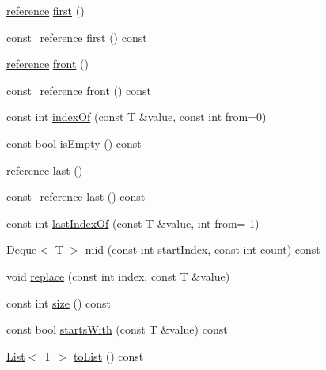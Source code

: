 \begin{DoxyCompactItemize}
\hyperlink{classprism_1_1_deque_a93d8792e719ca205ce1b9ed5d8207c1d}{reference} \hyperlink{classprism_1_1_deque_a9b4c76aae18b2d465f6e066fa3262cc4}{first} ()
\item 
\hyperlink{classprism_1_1_deque_a8fcabfe6976606b91b4abef0e0353584}{const\+\_\+reference} \hyperlink{classprism_1_1_deque_a3c85aba9fc52d657e965a7a395c16658}{first} () const 
\item 
\hyperlink{classprism_1_1_deque_a93d8792e719ca205ce1b9ed5d8207c1d}{reference} \hyperlink{classprism_1_1_deque_a5aa3dba7ae441b15bed82bfe5fef72ff}{front} ()
\item 
\hyperlink{classprism_1_1_deque_a8fcabfe6976606b91b4abef0e0353584}{const\+\_\+reference} \hyperlink{classprism_1_1_deque_a59a99f0570bfafc33f5b95d40ae06a50}{front} () const 
\item 
const int \hyperlink{classprism_1_1_deque_a1605a58b1afea0d02f0897216322c698}{index\+Of} (const T \&value, const int from=0)
\item 
const bool \hyperlink{classprism_1_1_deque_a848de5d427bfb87099f9992df2ff7596}{is\+Empty} () const 
\item 
\hyperlink{classprism_1_1_deque_a93d8792e719ca205ce1b9ed5d8207c1d}{reference} \hyperlink{classprism_1_1_deque_a9ca3d5be5c2e941af1a14c1383063ae7}{last} ()
\item 
\hyperlink{classprism_1_1_deque_a8fcabfe6976606b91b4abef0e0353584}{const\+\_\+reference} \hyperlink{classprism_1_1_deque_ae9d494c23c0a73603380d44f4e7070e6}{last} () const 
\item 
const int \hyperlink{classprism_1_1_deque_ae910373e27a9c0a453588bd8c928145e}{last\+Index\+Of} (const T \&value, int from=-\/1)
\item 
\hyperlink{classprism_1_1_deque}{Deque}$<$ T $>$ \hyperlink{classprism_1_1_deque_a456190fa35c2e5eee950b0ef61e75866}{mid} (const int start\+Index, const int \hyperlink{classprism_1_1_deque_aeac135daab988ebe38d4a1c8e7e9d193}{count}) const 
\item 
void \hyperlink{classprism_1_1_deque_a990a2499c18ace8ad27a62f247cc5f01}{replace} (const int index, const T \&value)
\item 
const int \hyperlink{classprism_1_1_deque_a38e141650506c5b320093c5bd5486a8c}{size} () const 
\item 
const bool \hyperlink{classprism_1_1_deque_a4f98d7d14a08511fca808ec0ba5b1060}{starts\+With} (const T \&value) const 
\item 
\hyperlink{classprism_1_1_list}{List}$<$ T $>$ \hyperlink{classprism_1_1_deque_a286993d1186852864d8dbed773e0dbbc}{to\+List} () const 

\end{DoxyCompactItemize}
